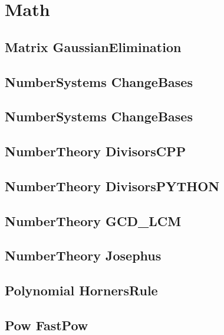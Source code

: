 \section{Math}
\subsection{Matrix GaussianElimination}
\raggedbottom
\hrulefill
\subsection{NumberSystems ChangeBases}
\raggedbottom
\hrulefill
\subsection{NumberSystems ChangeBases}
\raggedbottom
\hrulefill
\subsection{NumberTheory DivisorsCPP}
\raggedbottom
\hrulefill
\subsection{NumberTheory DivisorsPYTHON}
\raggedbottom
\hrulefill
\subsection{NumberTheory GCD_LCM}
\raggedbottom
\hrulefill
\subsection{NumberTheory Josephus}
\raggedbottom
\hrulefill
\subsection{Polynomial HornersRule}
\raggedbottom
\hrulefill
\subsection{Pow FastPow}
\raggedbottom
\hrulefill

